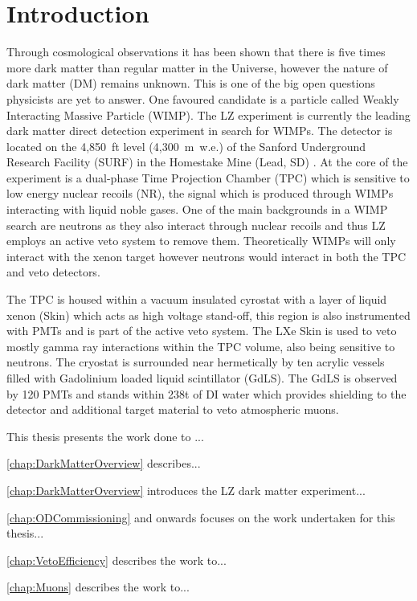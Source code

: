 \chapter{Introduction}
Through cosmological observations it has been shown that there is five times more dark matter than regular matter in the Universe, however the nature of dark matter (DM) remains unknown. This is one of the big open questions physicists are yet to answer. One favoured candidate is a particle called Weakly Interacting Massive Particle (WIMP). The LZ experiment is currently the leading dark matter direct detection experiment in search for WIMPs. The detector is located on the 4,850~ft level (4,300~m~w.e.) of the Sanford Underground Research Facility (SURF) in the Homestake Mine (Lead, SD) \cite{LZNIMA}. At the core of the experiment is a dual-phase Time Projection Chamber (TPC) which is sensitive to low energy nuclear recoils (NR), the signal which is produced through WIMPs interacting with liquid noble gases. One of the main backgrounds in a WIMP search are neutrons as they also interact through nuclear recoils and thus LZ employs an active veto system to remove them. Theoretically WIMPs will only interact with the xenon target however neutrons would interact in both the TPC and veto detectors.

The TPC is housed within a vacuum insulated cyrostat with a layer of liquid xenon (Skin) which acts as high voltage stand-off, this region is also instrumented with PMTs and is part of the active veto system. The LXe Skin is used to veto mostly gamma ray interactions within the TPC volume, also being sensitive to neutrons. The cryostat is surrounded near hermetically by ten acrylic vessels filled with  Gadolinium loaded liquid scintillator (GdLS). The GdLS is observed by 120 PMTs and stands within 238t of DI water which provides shielding to the detector and additional target material to veto atmospheric muons.

This thesis presents the work done to ...

\autoref{chap:DarkMatterOverview} describes...

\autoref{chap:DarkMatterOverview} introduces the LZ dark matter experiment...

\autoref{chap:ODCommissioning} and onwards focuses on the work undertaken for this thesis...

\autoref{chap:VetoEfficiency} describes the work to...

\autoref{chap:Muons} describes the work to...